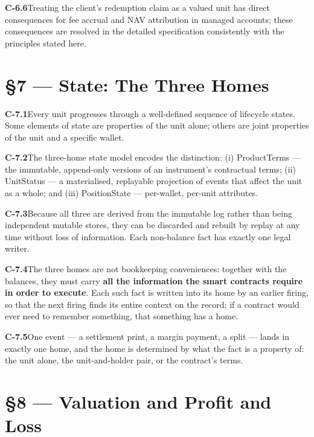 \documentclass[11pt,a4paper]{article}
\newcommand{\clause}[2]{\par\medskip\noindent\textbf{#1}\hspace{0.6em}#2}
\begin{document}
\clause{C-6.6}{Treating the client's redemption claim as a valued unit has direct
consequences for fee accrual and NAV attribution in managed accounts; these
consequences are resolved in the detailed specification consistently with the
principles stated here.}

\section*{\S7 --- State: The Three Homes}

\clause{C-7.1}{Every unit progresses through a well-defined sequence of lifecycle
states. Some elements of state are properties of the unit alone; others are joint
properties of the unit and a specific wallet.}

\clause{C-7.2}{The three-home state model encodes the distinction: (i) ProductTerms
--- the immutable, append-only versions of an instrument's contractual terms; (ii)
UnitStatus --- a materialised, replayable projection of events that affect the unit
as a whole; and (iii) PositionState --- per-wallet, per-unit attributes.}

\clause{C-7.3}{Because all three are derived from the immutable log rather than
being independent mutable stores, they can be discarded and rebuilt by replay at
any time without loss of information. Each non-balance fact has exactly one legal
writer.}

\clause{C-7.4}{The three homes are not bookkeeping conveniences: together with the
balances, they must carry \textbf{all the information the smart contracts require
in order to execute}. Each such fact is written into its home by an earlier
firing, so that the next firing finds its entire context on the record; if a
contract would ever need to remember something, that something has a home.}

\clause{C-7.5}{One event --- a settlement print, a margin payment, a split ---
lands in exactly one home, and the home is determined by what the fact is a
property of: the unit alone, the unit-and-holder pair, or the contract's terms.}

\section*{\S8 --- Valuation and Profit and Loss}
\end{document}
